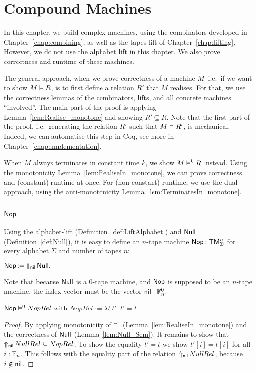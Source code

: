 \chapter{Compound Machines}
\label{cha:compound}

In this chapter, we build complex machines, using the combinators developed in Chapter~\ref{chap:combining}, as well as the tapes-lift of
Chapter~\ref{chap:lifting}.  However, we do not use the alphabet lift in this chapter.  We also prove correctness and runtime of these machines.

The general approach, when we prove correctness of a machine $M$, i.e.\ if we want to show $M \mathrel{\vDash} R$, is to first define a relation $R'$ that $M$
realises.  For that, we use the correctness lemmas of the combinators, lifts, and all concrete machines ``involved''.  The main part of the proof is
applying Lemma~\ref{lem:Realise_monotone} and showing $R' \subseteq R$.  Note that the first part of the proof, i.e.\ generating the relation $R'$
such that $M \mathrel{\vDash} R'$, is mechanical.  Indeed, we can automatise this step in Coq, see more in Chapter~\ref{chap:implementation}.

When $M$ always terminates in constant time $k$, we show $M \mathrel{\vDash^{k}} R$ instead.  Using the monotonicity Lemma~\ref{lem:RealiseIn_monotone}, we
can prove correctness and (constant) runtime at once.  For (non-constant) runtime, we use the dual approach, using the anti-monotonicity
Lemma~\ref{lem:TerminatesIn_monotone}.

\section{$\Nop$}
\label{sec:Nop}

Using the alphabet-lift (Definition~\ref{def:LiftAlphabet}) and $\mathsf{Null}$ (Definition~\ref{def:Null}), it is easy to define an $n$-tape machine
$\mathsf{Nop} : \mathsf{TM}_\Sigma^n$ for every alphabet $\Sigma$ and number of tapes $n$:
\begin{definition}[$\Nop$]
  $\mathsf{Nop} \mathop{:=} \mathop{\Uparrow_{\mathsf{nil}}} \mathsf{Null}.$
\end{definition}
Note that because $\mathsf{Null}$ is a 0-tape machine, and $\Nop$ is supposed to be an $n$-tape machine, the index-vector must be the vector
$\mathsf{nil} : \mathbb{F}_n^0$.

\begin{lemma}
  \label{lem:Nop_Sem}
  $\mathsf{Nop} \mathrel{\vDash^{0}} NopRel$ with $NopRel := \lambda t~t'.~t'=t$.
\end{lemma}
\begin{proof}
  By applying monotonicity of $\mathrel{\vDash^{\cdot}}$ (Lemma~\ref{lem:RealiseIn_monotone}) and the correctness of $\mathsf{Null}$ (Lemma~\ref{lem:Null_Sem}).  It
  remains to show that $\mathop{\Uparrow_{\mathsf{nil}}} NullRel \subseteq NopRel$.  To show the equality $t'=t$ we show $t'[i]=t[i]$ for all $i:\mathbb{F}_n$.  This
  follows with the equality part of the relation $\mathop{\Uparrow_{\mathsf{nil}}} NullRel$, because $i \notin \mathsf{nil}$.
\end{proof}

